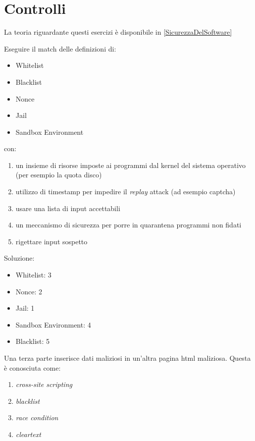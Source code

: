 \section{Controlli}
\label{es:Controlli}

La teoria riguardante questi esercizi è disponibile in \ref{SicurezzaDelSoftware}

\begin{Exercise} [
  title={Associa i termini},
  label={esControlli1}
  ]

  \Question Eseguire il match delle definizioni di:
\begin{itemize}
\item Whitelist
\item Blacklist
\item Nonce
\item Jail
\item Sandbox Environment
\end{itemize}
con:
\begin{enumerate}
 \item un insieme di risorse imposte ai programmi dal kernel del sistema
operativo (per esempio la quota disco)
 \item utilizzo di timestamp per impedire il \textit{replay} attack (ad esempio
captcha)
 \item usare una lista di input accettabili
 \item un meccanismo di sicurezza per porre in quarantena programmi non fidati
 \item rigettare input sospetto
\end{enumerate}

\end{Exercise}

\begin{Answer} [
  ref={esControlli1},
  number={1}
  ]

  \Question Soluzione:
\begin{itemize}
\item Whitelist: 3
\item Nonce: 2
\item Jail: 1
\item Sandbox Environment: 4
\item Blacklist: 5

\end{itemize}

\end{Answer}



\begin{Exercise} [
  title={Quiz},
  label={esControlli2}
  ]

  \Question Una terza parte inserisce dati maliziosi in un'altra pagina html
maliziosa. Questa è conosciuta come:
\begin{enumerate}
\item \textit{cross-site scripting}
\item \textit{blacklist}
\item \textit{race condition}
\item \textit{cleartext}
\end{enumerate}

\end{Exercise}

